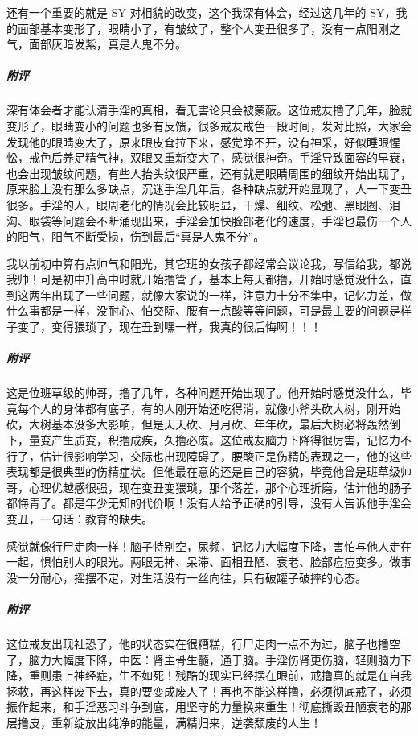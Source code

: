 \begin{case}[变丑]
    还有一个重要的就是 SY 对相貌的改变，这个我深有体会，经过这几年的 SY，我的面部基本变形了，眼睛小了，有皱纹了，整个人变丑很多了，没有一点阳刚之气，面部灰暗发紫，真是人鬼不分。
    \subparagraph{附评} 深有体会者才能认清手淫的真相，看无害论只会被蒙蔽。这位戒友撸了几年，脸就变形了，眼睛变小的问题也多有反馈，很多戒友戒色一段时间，发对比照，大家会发现他的眼睛变大了，原来眼皮耷拉下来，感觉睁不开，没有神采，好似睡眼惺忪，戒色后养足精气神，双眼又重新变大了，感觉很神奇。手淫导致面容的早衰，也会出现皱纹问题，有些人抬头纹很严重，还有就是眼睛周围的细纹开始出现了，原来脸上没有那么多缺点，沉迷手淫几年后，各种缺点就开始显现了，人一下变丑很多。手淫的人，眼周老化的情况会比较明显，干燥、细纹、松弛、黑眼圈、泪沟、眼袋等问题会不断涌现出来，手淫会加快脸部老化的速度，手淫也最伤一个人的阳气，阳气不断受损，伤到最后“真是人鬼不分”。
\end{case}

\begin{case}[变丑]
    我以前初中算有点帅气和阳光，其它班的女孩子都经常会议论我，写信给我，都说我帅！可是初中升高中时就开始撸管了，基本上每天都撸，开始时感觉没什么，直到这两年出现了一些问题，就像大家说的一样，注意力十分不集中，记忆力差，做什么事都是一样，没耐心、怕交际、腰有一点酸等等问题，可是最主要的问题是样子变了，变得猥琐了，现在丑到嘿一样，我真的很后悔啊！！！
    \subparagraph{附评} 这是位班草级的帅哥，撸了几年，各种问题开始出现了。他开始时感觉没什么，毕竟每个人的身体都有底子，有的人刚开始还吃得消，就像小斧头砍大树，刚开始砍，大树基本没多大影响，但是天天砍、月月砍、年年砍，最后大树必将轰然倒下，量变产生质变，积撸成疾，久撸必废。这位戒友脑力下降得很厉害，记忆力不行了，估计很影响学习，交际也出现障碍了，腰酸正是伤精的表现之一，他的这些表现都是很典型的伤精症状。但他最在意的还是自己的容貌，毕竟他曾是班草级帅哥，心理优越感很强，现在变丑变猥琐，那个落差，那个心理折磨，估计他的肠子都悔青了。都是年少无知的代价啊！没有人给予正确的引导，没有人告诉他手淫会变丑，一句话：教育的缺失。
\end{case}

\begin{case}[变丑]
    感觉就像行尸走肉一样！脑子特别空，尿频，记忆力大幅度下降，害怕与他人走在一起，惧怕别人的眼光。两眼无神、呆滞、面相丑陋、衰老、脸部痘痘变多。做事没一分耐心，摇摆不定，对生活没有一丝向往，只有破罐子破摔的心态。
    \subparagraph{附评} 这位戒友出现社恐了，他的状态实在很糟糕，行尸走肉一点不为过，脑子也撸空了，脑力大幅度下降，中医：肾主骨生髓，通于脑。手淫伤肾更伤脑，轻则脑力下降，重则患上神经症，生不如死！残酷的现实已经摆在眼前，戒撸真的就是在自我拯救，再这样废下去，真的要变成废人了！再也不能这样撸，必须彻底戒了，必须振作起来，和手淫恶习斗争到底，用坚守的力量换来重生！彻底撕毁丑陋衰老的那层撸皮，重新绽放出纯净的能量，满精归来，逆袭颓废的人生！
\end{case}

